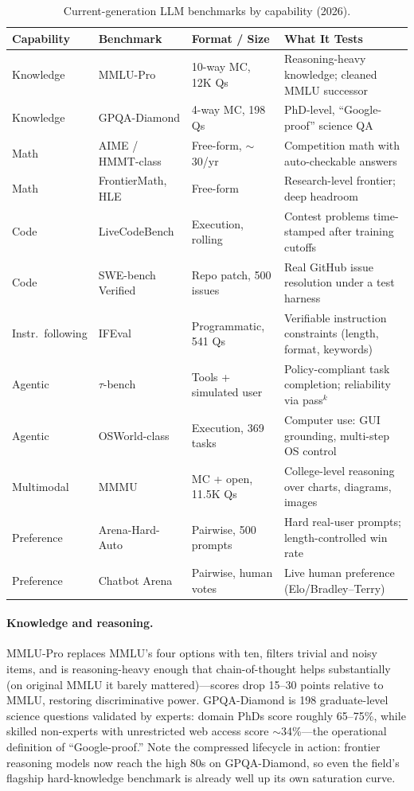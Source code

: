 \begin{table}[H]
\centering
\caption{Current-generation LLM benchmarks by capability (2026).}
\label{tab:benchmarks}
\begin{tabularx}{\textwidth}{@{}l l l X@{}}
\toprule
\textbf{Capability} & \textbf{Benchmark} & \textbf{Format / Size} & \textbf{What It Tests} \\
\midrule
Knowledge     & MMLU-Pro          & 10-way MC, 12K Qs      & Reasoning-heavy knowledge; cleaned MMLU successor \\
Knowledge     & GPQA-Diamond      & 4-way MC, 198 Qs       & PhD-level, ``Google-proof'' science QA \\
Math          & AIME / HMMT-class & Free-form, $\sim$30/yr & Competition math with auto-checkable answers \\
Math          & FrontierMath, HLE & Free-form              & Research-level frontier; deep headroom \\
Code          & LiveCodeBench     & Execution, rolling     & Contest problems time-stamped after training cutoffs \\
Code          & SWE-bench Verified & Repo patch, 500 issues & Real GitHub issue resolution under a test harness \\
Instr.\ following & IFEval        & Programmatic, 541 Qs   & Verifiable instruction constraints (length, format, keywords) \\
Agentic       & $\tau$-bench      & Tools + simulated user & Policy-compliant task completion; reliability via pass$^k$ \\
Agentic       & OSWorld-class     & Execution, 369 tasks   & Computer use: GUI grounding, multi-step OS control \\
Multimodal    & MMMU              & MC + open, 11.5K Qs    & College-level reasoning over charts, diagrams, images \\
Preference    & Arena-Hard-Auto   & Pairwise, 500 prompts  & Hard real-user prompts; length-controlled win rate \\
Preference    & Chatbot Arena     & Pairwise, human votes  & Live human preference (Elo/Bradley--Terry) \\
\bottomrule
\end{tabularx}
\end{table}

\paragraph{Knowledge and reasoning.}
MMLU-Pro replaces MMLU's four options with ten, filters trivial and noisy
items, and is reasoning-heavy enough that chain-of-thought helps
substantially (on original MMLU it barely mattered)---scores drop 15--30
points relative to MMLU, restoring discriminative power.  GPQA-Diamond is
198 graduate-level science questions validated by experts: domain PhDs score
roughly 65--75\%, while skilled non-experts with unrestricted web access
score $\sim$34\%---the operational definition of ``Google-proof.''  Note the
compressed lifecycle in action: frontier reasoning models now reach the high
80s on GPQA-Diamond, so even the field's flagship hard-knowledge benchmark is
already well up its own saturation curve.

